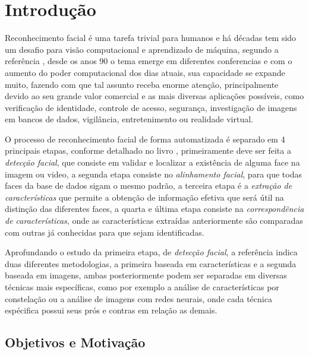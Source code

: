 
\chapter*[Introdução]{Introdução}

Reconhecimento facial é uma tarefa trivial para humanos e há décadas tem sido um desafio para visão computacional e aprendizado de máquina, segundo a referência , desde os anos 90 o tema emerge em diferentes conferencias e com o aumento do poder computacional dos dias atuais, sua capacidade se expande muito, fazendo com que tal assunto receba enorme atenção, principalmente devido ao seu grande valor comercial e as mais diversas aplicações possíveis, como verificação de identidade, controle de acesso, segurança, investigação de imagens em bancos de dados, vigilância, entretenimento ou realidade virtual. \cite{appli2014} \cite{Zhao:2003:FRL:954339.954342}

O processo de reconhecimento facial de forma automatizada é separado em 4 principais etapas, conforme detalhado no livro , primeiramente deve ser feita a \textit{detecção facial}, que consiste em validar e localizar a existência de alguma face na imagem ou video, a segunda etapa consiste no \textit{alinhamento facial}, para que todas faces da base de dados sigam o mesmo padrão, a terceira etapa é a \textit{extração de características} que permite a obtenção de informação efetiva que será útil na distinção das diferentes faces, a quarta e última etapa consiste na \textit{correspondência de características}, onde as características extraídas anteriormente são comparadas com outras já conhecidas para que sejam identificadas.

Aprofundando o estudo da primeira etapa, de \textit{detecção facial}, a referência  indica duas diferentes metodologias, a primeira baseada em características e a segunda baseada em imagens, ambas posteriormente podem ser separadas em diversas técnicas mais específicas, como por exemplo a análise de características por constelação ou a análise de imagens com redes neurais, onde cada técnica espécifica possui seus prós e contras em relação as demais.

\section{Objetivos e Motivação}

